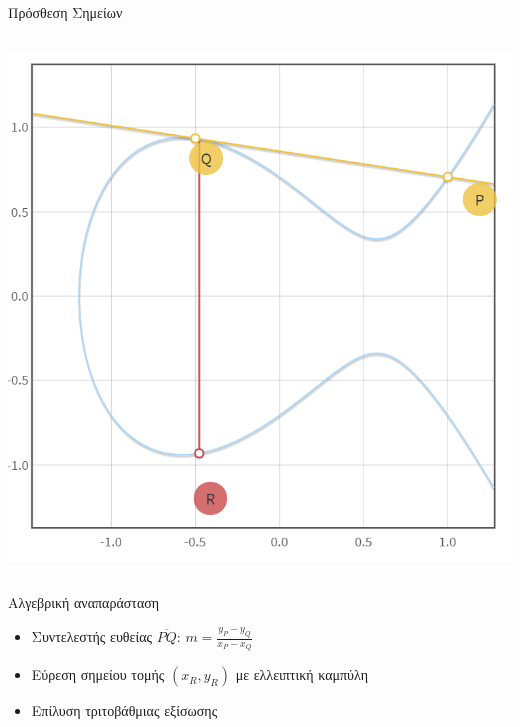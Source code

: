 \documentclass[handout]{beamer}
\begin{document}
\begin{frame}[allowframebreaks]{Πρόσθεση Σημείων}
\begin{columns}
\begin{center}
\includegraphics[scale=0.23]{add2.png} 
\end{center}
\end{columns}

\framebreak

\begin{block}{Αλγεβρική αναπαράσταση}
\begin{itemize}
	\item Συντελεστής ευθείας $\overline{PQ}$: $m = \frac{y_P-y_Q}{x_P-x_Q}$
	\item Εύρεση σημείου τομής $(x_R, y_R)$ με ελλειπτική καμπύλη
	\item Επίλυση τριτοβάθμιας εξίσωσης
\end{itemize}
\end{block}

\end{frame}
\end{document}
